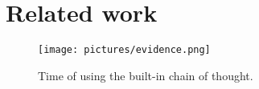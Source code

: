\section{Related work}
\paperrelatedwork

\begin{figure}
	\centering
	\texttt{[image: pictures/evidence.png]}
	\caption{Time of using the built-in chain of thought.}
	\label{fig:fig1}
\end{figure}